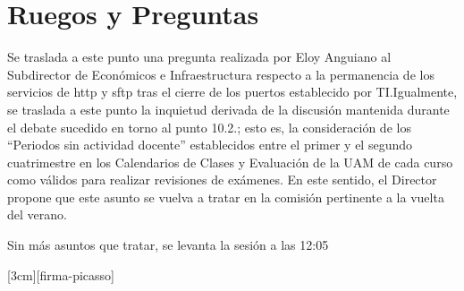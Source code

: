 \documentclass[numerado]{plantillasEPS} %
\begin{document}
\section{Ruegos y Preguntas}

Se  traslada  a  este  punto  una  pregunta  realizada  por  Eloy  Anguiano  al  Subdirector  de Económicos  e  Infraestructura respecto  a  la  permanencia  de  los  servicios  de  http  y  sftp tras el cierre de los puertos establecido por TI.Igualmente,  se  traslada  a  este  punto  la  inquietud  derivada  de  la discusión  mantenida durante  el  debate  sucedido  en  torno  al  punto  10.2.;  esto  es,  la  consideración  de  los “Periodos sin actividad docente” establecidos entre el primer y el segundo cuatrimestre en  los  Calendarios  de  Clases  y  Evaluación  de  la  UAM  de  cada  curso  como  válidos  para realizar  revisiones  de  exámenes. En  este  sentido,  el Director  propone que  este  asunto se vuelva a tratar en la comisión pertinente a la vuelta del verano. 

Sin más asuntos que tratar, se levanta la sesión a las 12:05


[3cm][firma-picasso]
\end{document}
